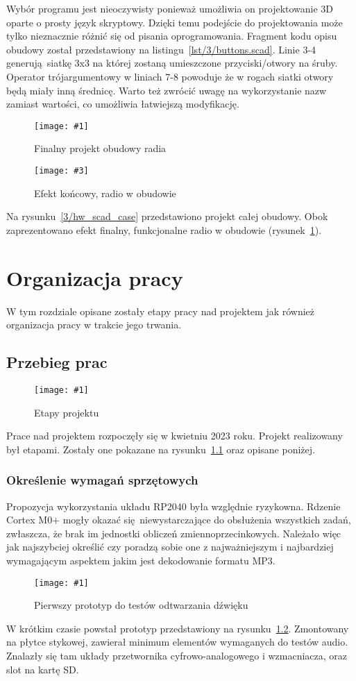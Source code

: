 \documentclass[polish]{aghengthesis}
\newcommand{\imgint}[4]{
	\begin{figure}[{#4}]
		\centering
		\texttt{[image: \#1]}
		\caption{#2}
		\label{#1}
	\end{figure}
}
\newcommand{\imgh}[3]{\imgint{#1}{#2}{#3}{H}}
\newcommand{\imgintss}[5]{
	\begin{figure}[{#5}]
		\centering
		\begin{minipage}{.45\textwidth}
			\centering
			\texttt{[image: \#1]}
			\caption{#2}
			\label{#1}
		\end{minipage}%
		\hfill
		\begin{minipage}{.45\textwidth}
			\centering
			\texttt{[image: \#3]}
			\caption{#4}
			\label{#3}
		\end{minipage}
	\end{figure}
}
\newcommand{\imghss}[4]{\imgintss{#1}{#2}{#3}{#4}{H}}
\begin{document}
			Wybór programu jest nieoczywisty ponieważ umożliwia on projektowanie 3D oparte o prosty język skryptowy. Dzięki temu podejście do projektowania może tylko nieznacznie różnić się od pisania oprogramowania. Fragment kodu opisu obudowy został przedstawiony na listingu~\ref{lst/3/buttons.scad}. Linie 3-4 generują siatkę 3x3 na której zostaną umieszczone przyciski/otwory na śruby. Operator trójargumentowy w liniach 7-8 powoduje że w rogach siatki otwory będą miały inną średnicę. Warto też zwrócić uwagę na wykorzystanie nazw zamiast wartości, co umożliwia łatwiejszą modyfikację.
			
			\imghss{3/hw_scad_case}{Finalny projekt obudowy radia}{3/hw_case}{Efekt końcowy, radio w obudowie}
			
			Na rysunku~\ref{3/hw_scad_case} przedstawiono projekt całej obudowy. Obok zaprezentowano efekt finalny, funkcjonalne radio w obudowie (rysunek~\ref{3/hw_case}).
			
\chapter{Organizacja pracy}
	W tym rozdziale opisane zostały etapy pracy nad projektem jak również organizacja pracy w trakcie jego trwania.
	
	\section{Przebieg prac}
		\imgh{4/PicoRadio-steps}{Etapy projektu}{1}
	
		Prace nad projektem rozpoczęły się w kwietniu 2023 roku. Projekt realizowany był etapami. Zostały one pokazane na rysunku~\ref{4/PicoRadio-steps} oraz opisane poniżej.
		
		\subsection{Określenie wymagań sprzętowych}
			Propozycja wykorzystania układu RP2040 była względnie ryzykowna. Rdzenie Cortex M0+ mogły okazać się niewystarczające do obsłużenia wszystkich zadań, zwłaszcza, że brak im jednostki obliczeń zmiennoprzecinkowych. Należało więc jak najszybciej określić czy poradzą sobie one z najważniejszym i najbardziej wymagającym aspektem jakim jest dekodowanie formatu MP3.
			
			\imgh{4/prototype_1}{Pierwszy prototyp do testów odtwarzania dźwięku}{0.6}
			
			W krótkim czasie powstał prototyp przedstawiony na rysunku~\ref{4/prototype_1}. Zmontowany na płytce stykowej, zawierał minimum elementów wymaganych do testów audio. Znalazły się tam układy przetwornika cyfrowo-analogowego i wzmacniacza, oraz slot na kartę SD.
			
\end{document}
